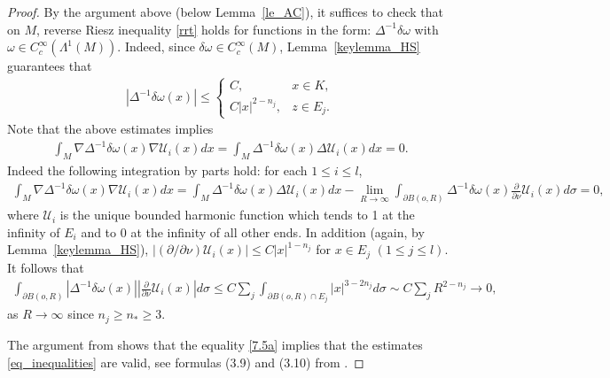 \documentclass[12pt]{amsart}
\begin{document}
\begin{proof}
By the argument above (below Lemma~\ref{le_AC}), it suffices to check that on $M$, reverse Riesz inequality \eqref{rrt} holds for functions in the form: $\Delta^{-1} \delta \omega$ with $\omega \in C_c^\infty(\Lambda^1(M))$. Indeed, since $\delta \omega \in C_c^\infty(M)$, Lemma~\ref{keylemma_HS} guarantees that
\begin{align*}
    |\Delta^{-1}\delta \omega(x)| \le \begin{cases}
        C, & x\in K,\\
        C |x|^{2-n_j}, & z\in E_j.
    \end{cases}
\end{align*}
Note that the above estimates implies 
\begin{align}\label{7.5a}
    \int_M \nabla \Delta^{-1}\delta \omega(x) \nabla \mathcal{U}_i(x) dx = \int_M \Delta^{-1}\delta \omega(x) \Delta \mathcal{U}_i(x) dx = 0.
\end{align}
Indeed the following integration by parts hold: for each $1\le i\le l$,
\begin{align*}
    \int_M \nabla \Delta^{-1}\delta \omega(x) \nabla \mathcal{U}_i(x) dx = \int_M \Delta^{-1}\delta \omega(x) \Delta \mathcal{U}_i(x) dx - \lim_{R\to \infty} \int_{\partial B(o,R)} \Delta^{-1} \delta \omega(x) \frac{\partial}{\partial \nu} \mathcal{U}_i(x) d\sigma = 0,
\end{align*}
where $\mathcal{U}_i$ is the unique bounded harmonic function which tends to 1 at the infinity of $E_i$ and to 0 at the infinity of all other ends. In addition (again, by Lemma~\ref{keylemma_HS}), $|(\partial/\partial \nu) \mathcal{U}_i(x)|\le C |x|^{1-n_j}$ for $x\in E_j$ $(1\le j\le l)$. It follows that 
\begin{align*}
\int_{\partial B(o,R)} |\Delta^{-1} \delta \omega(x)| \left|\frac{\partial}{\partial \nu} \mathcal{U}_i(x) \right| d\sigma \le C \sum_{j} \int_{\partial B(o,R) \cap E_j} |x|^{3-2 n_j} d\sigma \sim C \sum_j R^{2-n_j} \to 0,
\end{align*}
as $R\to \infty$ since $n_j \ge n_* \ge 3$.


The argument from \cite{He2} shows that the equality \eqref{7.5a} implies that the estimates \eqref{eq_inequalities} are valid, see formulas (3.9) and (3.10) from \cite{He2}.
\end{proof}
\end{document}
